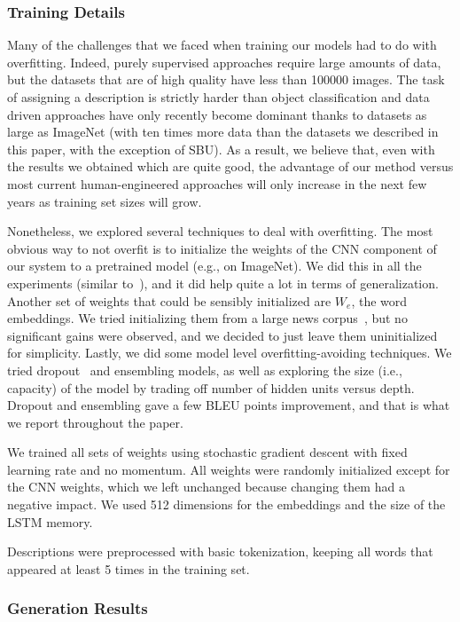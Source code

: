 \subsubsection{Training Details}

Many of the challenges that we faced when training our models had to do with overfitting.
Indeed, purely supervised approaches require large amounts of data, but the datasets
that are of high quality have less than 100000 images. The task
of assigning a description is strictly harder than object classification and
data driven approaches have only recently become dominant thanks to datasets as large as ImageNet
(with ten times more data than the datasets we described in this paper, with the exception of SBU).
As a result, we believe that, even with the results we obtained which are quite good, the advantage
of our method versus most current human-engineered approaches will only increase in the next few years as training set sizes will grow.

Nonetheless, we explored several techniques to deal with overfitting. The most obvious
way to not overfit is to initialize the weights of the CNN component of our system to
a pretrained model (e.g., on ImageNet). We did this in all the experiments (similar to~\cite{gong2014improving}),
and it did help quite a lot in terms of generalization. Another set of weights that could
be sensibly initialized are $W_e$, the word embeddings. We tried initializing them
from a large news corpus~\cite{mikolov2013}, but no significant gains were observed, and we decided
to just leave them uninitialized for simplicity. Lastly, we did some model level overfitting-avoiding
techniques. We tried dropout~\cite{zaremba2014} and ensembling models, as well as exploring the size
(i.e., capacity) of the model by trading off number of hidden units versus depth. Dropout and ensembling
gave a few BLEU points improvement, and that is what we report throughout the paper.

We trained all sets of weights using stochastic gradient descent
with fixed learning rate and no momentum.
All weights were randomly initialized except for the CNN weights,
which we left unchanged because changing them had a negative impact.
We used 512 dimensions for the embeddings and the size of the LSTM memory.

Descriptions were preprocessed with basic tokenization, keeping all words
that appeared at least 5 times in the training set.

\subsubsection{Generation Results}

